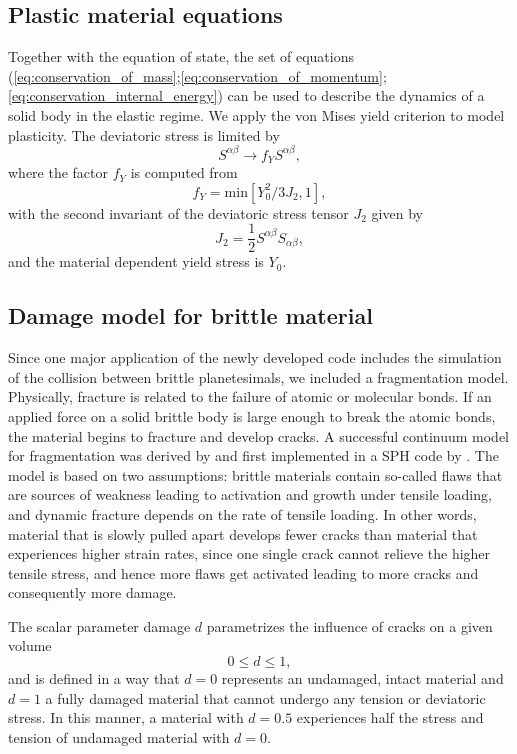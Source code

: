 \documentclass[10pt,fleqn,twoside]{article}
\begin{document}
\subsection{Plastic material equations}
Together with the equation of state, the set of equations
(\ref{eq:conservation_of_mass};\ref{eq:conservation_of_momentum};\ref{eq:conservation_internal_energy}) can be used to
describe the dynamics of a solid body in the elastic regime. We apply the von Mises yield
criterion \citep{vonmises1913} to model plasticity. The deviatoric stress is
limited by
%
\begin{equation}
 S^{\alpha \beta} \rightarrow f_Y S^{\alpha \beta},
\end{equation}
where the factor $f_Y$ is computed from
\begin{equation}
 f_Y = \mathrm{min} \left[ Y_0^2/3J_2, 1 \right],
\end{equation}
with the second invariant of the deviatoric stress tensor $J_2$ given by
%
\begin{equation}
 J_2 = \frac{1}{2} S^{\alpha \beta} S_{\alpha \beta},
\end{equation}
and the material dependent yield stress is $Y_0$.
%
\subsection{Damage model for brittle material}
\label{section:damage_model}
Since one major application of the newly developed code includes the simulation of the collision between
brittle planetesimals, we included a fragmentation model. Physically, fracture is related to the
failure of atomic or molecular bonds. If an applied force on a solid brittle body is large enough to break the atomic
bonds, the material begins to fracture and develop cracks. A successful continuum model for fragmentation was
derived by \cite{grady:1980} and first implemented in a SPH code by \cite{benz:1995}. The model is based on
two assumptions: brittle materials contain so-called flaws that are sources of weakness leading to activation and
growth under tensile loading, and dynamic fracture depends on the rate of tensile loading. In other words, material that
is slowly pulled apart develops fewer cracks than material that experiences higher strain rates, since one single
crack cannot relieve the higher tensile stress, and hence more flaws get activated leading to more cracks and
consequently more damage.

The scalar parameter damage $d$ parametrizes the influence of cracks on a given volume
\begin{equation}
 0 \leq d \leq 1,
\end{equation}
and is defined in a way that $d=0$ represents an undamaged, intact material and $d=1$ a fully damaged material that
cannot undergo any tension or deviatoric stress. In this manner, a material with $d=0.5$ experiences half the stress and
tension of undamaged material with $d=0$.
\end{document}
